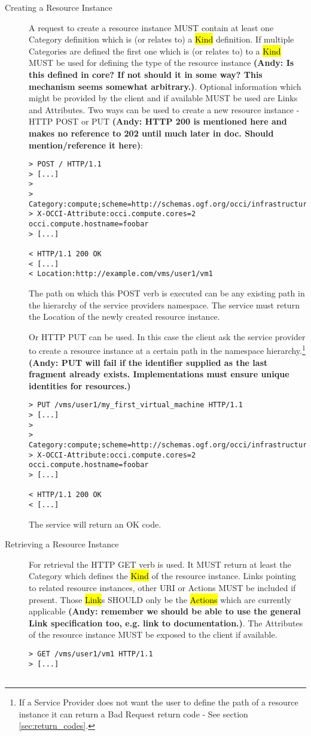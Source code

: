 \documentclass[10pt,a4paper]{article}
\begin{document}
\begin{description}
\item[Creating a Resource Instance] A request to create a resource
  instance MUST contain at least one Category definition which is (or
  relates to) a \hl{Kind} definition. If multiple Categories are
  defined the first one which is (or relates to) to a \hl{Kind} MUST
  be used for defining the type of the resource instance \textbf{(Andy: Is this defined in core? 
  If not should it in some way? This mechanism seems somewhat arbitrary.)}. Optional
  information which might be provided by the client and if available
  MUST be used are Links and Attributes. Two ways can be used to
  create a new resource instance - HTTP POST or PUT \textbf{(Andy: HTTP 200 is mentioned 
  here and makes no reference to 202 until much later in doc. Should mention/reference it here)}:
\begin{verbatim}
> POST / HTTP/1.1
> [...]
> 
> Category:compute;scheme=http://schemas.ogf.org/occi/infrastructure
> X-OCCI-Attribute:occi.compute.cores=2 occi.compute.hostname=foobar
> [...]
 
< HTTP/1.1 200 OK
< [...]
< Location:http://example.com/vms/user1/vm1
\end{verbatim}
  The path on which this POST verb is executed can be any existing
  path in the hierarchy of the service providers namespace. The
  service must return the Location of the newly created resource
  instance.

  Or HTTP PUT can be used. In this case the client ask the service
  provider to create a resource instance at a certain path in the
  namespace hierarchy.\footnote{If a Service Provider does not want the
    user to define the path of a resource instance it can return a Bad
    Request return code - See section \ref{sec:return_codes}.} \textbf{(Andy: PUT will fail if the 
    identifier supplied as the last fragment already exists. Implementations must ensure unique 
    identities for resources.)}
\begin{verbatim}
> PUT /vms/user1/my_first_virtual_machine HTTP/1.1
> [...]
> 
> Category:compute;scheme=http://schemas.ogf.org/occi/infrastructure
> X-OCCI-Attribute:occi.compute.cores=2 occi.compute.hostname=foobar
> [...]
 
< HTTP/1.1 200 OK
< [...]
\end{verbatim}
  The service will return an OK code.

\item[Retrieving a Resource Instance] For retrieval the HTTP GET verb
  is used. It MUST return at least the Category which defines the
  \hl{Kind} of the resource instance. Links pointing to related
  resource instances, other URI or Actions MUST be included if
  present. Those \hl{Link}s SHOULD only be the
  \hl{Actions} which are currently applicable \textbf{(Andy: remember we should be able to use the 
  general Link specification too, e.g. link to documentation.)}. The Attributes of the 
  resource instance MUST be exposed to
  the client if available.
\begin{verbatim}
> GET /vms/user1/vm1 HTTP/1.1
> [...]
 

\end{verbatim}
\end{description}
\end{document}
